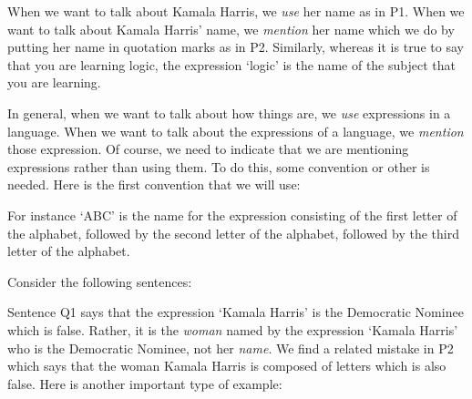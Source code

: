 \begin{earg}
\end{earg}

When we want to talk about Kamala Harris, we \textit{use} her name as in P1.
When we want to talk about Kamala Harris' name, we \textit{mention} her name which we do by putting her name in quotation marks as in P2.
Similarly, whereas it is true to say that you are learning logic, the expression `logic' is the name of the subject that you are learning. 

In general, when we want to talk about how things are, we \textit{use} expressions in a language.
When we want to talk about the expressions of a language, we \textit{mention} those expression.
Of course, we need to indicate that we are mentioning expressions rather than using them.
To do this, some convention or other is needed.
Here is the first convention that we will use:


For instance `ABC' is the name for the expression consisting of the first letter of the alphabet, followed by the second letter of the alphabet, followed by the third letter of the alphabet.

Consider the following sentences:

\begin{earg}
\end{earg}

Sentence Q1 says that the expression `Kamala Harris' is the Democratic Nominee which is false.
Rather, it is the \textit{woman} named by the expression `Kamala Harris' who is the Democratic Nominee, not her \textit{name}.
We find a related mistake in P2 which says that the woman Kamala Harris is composed of letters which is also false. %
Here is another important type of example:

  \begin{earg}
  \end{earg}


